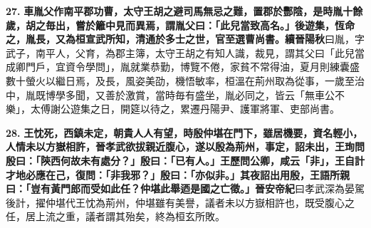 \textbf{27.} \textbf{車胤父作南平郡功曹，太守王胡之避司馬無忌之難，置郡於酆陰，是時胤十餘歲，胡之毎出，嘗於籬中見而異焉，謂胤父曰：「此兒當致高名。」後遊集，恆命之，胤長，又為桓宣武所知，清通於多士之世，官至選曹尚書。}{\footnotesize \textbf{續晉陽秋}曰胤，字武子，南平人，父育，為郡主簿，太守王胡之有知人識，裁見，謂其父曰「此兒當成卿門戶，宜資令學問」，胤就業恭勤，博覽不倦，家貧不常得油，夏月則練囊盛數十螢火以繼日焉，及長，風姿美劭，機悟敏率，桓溫在荊州取為從事，一歲至治中，胤既博學多聞，又善於激賞，當時毎有盛坐，胤必同之，皆云「無車公不樂」，太傅謝公遊集之日，開筵以待之，累遷丹陽尹、護軍將軍、吏部尚書。}

\textbf{28.} \textbf{王忱死，西鎮未定，朝貴人人有望，時殷仲堪在門下，雖居機要，資名輕小，人情未以方嶽相許，晉孝武欲拔親近腹心，遂以殷為荊州，事定，詔未出，王珣問殷曰：「陝西何故未有處分？」殷曰：「已有人。」王歷問公卿，咸云「非」，王自計才地必應在己，復問：「非我邪？」殷曰：「亦似非。」其夜詔出用殷，王語所親曰：「豈有黃門郎而受如此任？仲堪此舉迺是國之亡徵。」}{\footnotesize \textbf{晉安帝紀}曰孝武深為晏駕後計，擢仲堪代王忱為荊州，仲堪雖有美譽，議者未以方嶽相許也，既受腹心之任，居上流之重，議者謂其殆矣，終為桓玄所敗。}